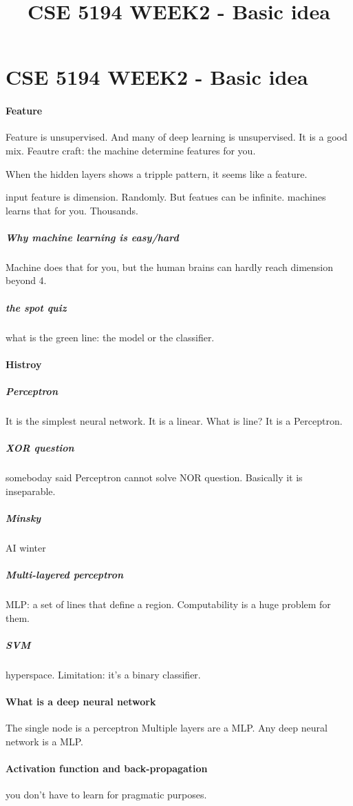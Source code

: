 \documentclass[12pt]{article}
\begin{document}
\newcommand\para{\par\refstepcounter{para}\thepara\space}

\section*{CSE 5194 WEEK2 - Basic idea}
    \title{CSE 5194 WEEK2 - Basic idea}
    \paragraph{Feature}
    Feature is unsupervised. And many of deep learning is unsupervised. It is a good mix. 
    Feautre craft: the machine determine features for you.

    When the hidden layers shows a tripple pattern, it seems like a feature.

    input feature is dimension. Randomly.
    But featues can be infinite. machines learns that for you. Thousands.

    \subparagraph{Why machine learning is easy/hard}
    Machine does that for you, but the human brains can hardly reach dimension beyond 4.

    \subparagraph{the spot quiz}
    what is the green line: the model or the classifier.

    \paragraph{Histroy}
    \subparagraph{Perceptron}
    It is the simplest neural network. It is a linear. What is line? It is a Perceptron.
    \subparagraph{XOR question}
    someboday said Perceptron cannot solve NOR question. Basically it is inseparable.
    \subparagraph{Minsky}
    AI winter
    \subparagraph{Multi-layered perceptron}  
    MLP: a set of lines that define a region.
    Computability is a huge problem for them.

    \subparagraph{SVM}
    hyperspace. Limitation: it's a binary classifier.

    \paragraph{What is a deep neural network}
    The single node is a perceptron
    Multiple layers are a MLP.
    Any deep neural network is a MLP.
    \paragraph{Activation function and back-propagation}
    you don't have to learn for pragmatic purposes.
\end{document}
